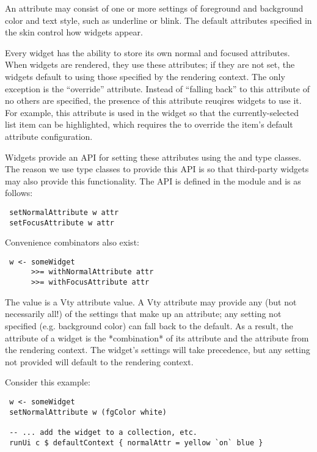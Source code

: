 An attribute may consist of one or more settings of foreground and
background color and text style, such as underline or blink.  The
default attributes specified in the skin control how widgets appear.

Every widget has the ability to store its own normal and focused
attributes.  When widgets are rendered, they use these attributes; if
they are not set, the widgets default to using those specified by the
rendering context.  The only exception is the ``override'' attribute.
Instead of ``falling back'' to this attribute of no others are
specified, the presence of this attribute reuqires widgets to use it.
For example, this attribute is used in the  widget so that
the currently-selected list item can be highlighted, which requires
the  to override the item's default attribute configuration.

Widgets provide an API for setting these attributes using the
 and  type classes.  The reason we
use type classes to provide this API is so that third-party widgets
may also provide this functionality.  The API is defined in the
 module and is as follows:

\begin{verbatim}
 setNormalAttribute w attr
 setFocusAttribute w attr
\end{verbatim}

Convenience combinators also exist:

\begin{verbatim}
 w <- someWidget
      >>= withNormalAttribute attr
      >>= withFocusAttribute attr
\end{verbatim}

The  value is a Vty attribute value.  A Vty attribute may provide
any (but not necessarily all!) of the settings that make up an
attribute; any setting not specified (e.g. background color) can fall
back to the default.  As a result, the attribute of a widget is the
*combination* of its attribute and the attribute from the rendering
context.  The widget's settings will take precedence, but any setting
not provided will default to the rendering context.

Consider this example:

\begin{verbatim}
 w <- someWidget
 setNormalAttribute w (fgColor white)

 -- ... add the widget to a collection, etc.
 runUi c $ defaultContext { normalAttr = yellow `on` blue }
\end{verbatim}

